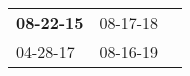 \begin{supertabular}{p{0.33\columnwidth}p{0.33\columnwidth}p{0.33\columnwidth}}
 \textbf{08-22-15\textsuperscript{}} &  08-17-18\textsuperscript{} \\
          04-28-17\textsuperscript{} &  08-16-19\textsuperscript{} \\
\end{supertabular}
